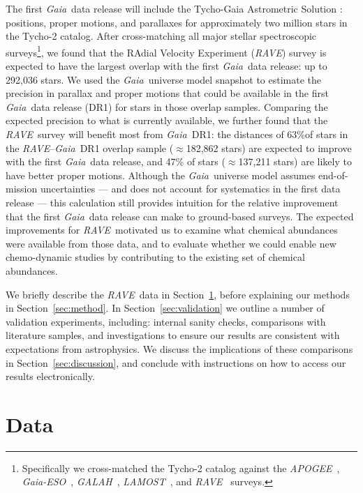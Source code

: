 \documentclass[preprint,trackchanges]{aastex}
\newcommand{\acronym}[1]{{\small{#1}}}
\newcommand{\project}[1]{\textsl{#1}}
\newcommand{\gaia}{\project{Gaia}}
\newcommand{\rave}{\project{\acronym{RAVE}}}
\newcommand{\galah}{\project{\acronym{GALAH}}}
\newcommand{\ges}{\project{Gaia-ESO}}
\newcommand{\apogee}{\project{\acronym{APOGEE}}}
\newcommand{\lamost}{\project{\acronym{LAMOST}}}
\newcommand{\tgas}{\project{\acronym{TGAS}}}
\begin{document}
The first \gaia\ data release will include the Tycho-Gaia Astrometric Solution
\citep[hereafter \tgas;][]{Michalik_2015a,Michalik_2015b}: positions, proper 
motions, and parallaxes for approximately two million stars in the Tycho-2 
\citep{Hog_2000} catalog.  After cross-matching all major stellar spectroscopic 
surveys\footnote{Specifically we cross-matched the Tycho-2 catalog against the 
\apogee\ \citep{Zasowski_2013}, \ges\ \citep{Gilmore_2012,Randich_2013}, 
\galah\ \citep{DeSilva_2015}, \lamost\ \citep{Cui_2012}, and \rave\ 
\citep{Steinmetz_2006} surveys.}, we found that the RAdial Velocity Experiment 
(\rave) survey is expected to have the largest overlap with the first \gaia\ 
data release: up to 292,036 stars.  We used the \gaia\ universe model snapshot 
\citep{Robin_2012} to estimate the precision in parallax and proper motions that
could be available in the first \gaia\ data release (DR1) for stars in those 
overlap samples.  Comparing the expected precision to what is currently available, 
we further found that the \rave\ survey will benefit most from \gaia\ DR1: the
distances of 63\%of stars in the \rave--\gaia\ DR1 overlap sample 
($\approx$182,862 stars) are expected to improve with the first \gaia\ data release, 
and 47\% of stars ($\approx$137,211 stars) are likely to have better proper motions. 
Although the \gaia\ universe model assumes end-of-mission uncertainties --- and does 
not account for systematics in the first data release --- this calculation still 
provides intuition for the relative improvement that the first \gaia\ data release 
can make to ground-based surveys.  The expected improvements for \rave\ motivated 
us to examine what chemical abundances were available from those data, and to 
evaluate whether we could enable new chemo-dynamic studies by contributing to the
existing set of chemical abundances.


We briefly describe the \rave\ data in Section~\ref{sec:data}, before explaining
our methods in Section~\ref{sec:method}.  In Section~\ref{sec:validation}
we outline a number of validation experiments, including: internal sanity checks,
comparisons with literature samples, and investigations to ensure our results
are consistent with expectations from astrophysics.  We discuss the implications
of these comparisons in Section~\ref{sec:discussion}, and conclude with instructions
on how to access our results electronically.


\section{Data}
\label{sec:data}
\end{document}
